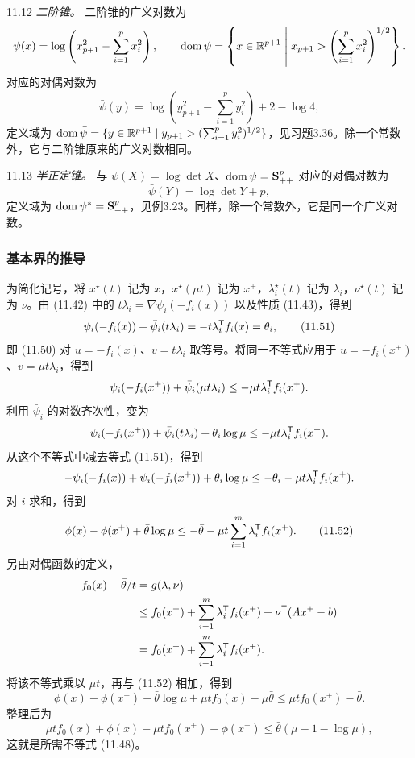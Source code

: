 \begin{origexample}{11.12}
\emph{二阶锥。} 二阶锥的广义对数为
\[
\psi(x)=\log\left(x_{p+1}^2-\sum_{i=1}^p x_i^2\right),\qquad
\operatorname{dom}\psi=\left\{x\in\mathbb R^{p+1}\;\middle|\;x_{p+1}>\left(\sum_{i=1}^p x_i^2\right)^{1/2}\right\}.
\]
对应的对偶对数为
\[
\bar\psi(y)=\log\left(y_{p+1}^2-\sum_{i=1}^p y_i^2\right)+2-\log4,
\]
定义域为 $\operatorname{dom}\bar\psi=\{y\in\mathbb R^{p+1}\mid y_{p+1}>(\sum_{i=1}^p y_i^2)^{1/2}\}$，见习题3.36。除一个常数外，它与二阶锥原来的广义对数相同。
\end{origexample}

\begin{origexample}{11.13}
\emph{半正定锥。} 与 $\psi(X)=\log\det X$、$\operatorname{dom}\psi=\mathbf S_{++}^p$ 对应的对偶对数为
\[
\bar\psi(Y)=\log\det Y+p,
\]
定义域为 $\operatorname{dom}\psi^*=\mathbf S_{++}^p$，见例3.23。同样，除一个常数外，它是同一个广义对数。
\end{origexample}

\subsubsection*{基本界的推导}
为简化记号，将 $x^\star(t)$ 记为 $x$，$x^\star(\mu t)$ 记为 $x^+$，$\lambda_i^\star(t)$ 记为 $\lambda_i$，$\nu^\star(t)$ 记为 $\nu$。由 (11.42) 中的 $t\lambda_i=\nabla\psi_i(-f_i(x))$ 以及性质 (11.43)，得到
\begin{equation}
\psi_i(-f_i(x))+\bar\psi_i(t\lambda_i)=-t\lambda_i^\mathsf T f_i(x)=\theta_i,\tag{11.51}
\end{equation}
即 (11.50) 对 $u=-f_i(x)$、$v=t\lambda_i$ 取等号。将同一不等式应用于 $u=-f_i(x^+)$、$v=\mu t\lambda_i$，得到
\[
\psi_i(-f_i(x^+))+\bar\psi_i(\mu t\lambda_i)\le-\mu t\lambda_i^\mathsf T f_i(x^+).
\]
利用 $\bar\psi_i$ 的对数齐次性，变为
\[
\psi_i(-f_i(x^+))+\bar\psi_i(t\lambda_i)+\theta_i\log\mu\le-\mu t\lambda_i^\mathsf T f_i(x^+).
\]
从这个不等式中减去等式 (11.51)，得到
\[
-\psi_i(-f_i(x))+\psi_i(-f_i(x^+))+\theta_i\log\mu
\le-\theta_i-\mu t\lambda_i^\mathsf T f_i(x^+).
\]
对 $i$ 求和，得到
\begin{equation}
\phi(x)-\phi(x^+)+\bar\theta\log\mu\le-\bar\theta-\mu t\sum_{i=1}^m\lambda_i^\mathsf T f_i(x^+).\tag{11.52}
\end{equation}
另由对偶函数的定义，
\begin{align*}
f_0(x)-\bar\theta/t&=g(\lambda,\nu)\\
&\le f_0(x^+)+\sum_{i=1}^m\lambda_i^\mathsf T f_i(x^+)+\nu^\mathsf T(Ax^+-b)\\
&=f_0(x^+)+\sum_{i=1}^m\lambda_i^\mathsf T f_i(x^+).
\end{align*}
将该不等式乘以 $\mu t$，再与 (11.52) 相加，得到
\[
\phi(x)-\phi(x^+)+\bar\theta\log\mu+\mu t f_0(x)-\mu\bar\theta
\le\mu t f_0(x^+)-\bar\theta.
\]
整理后为
\[
\mu t f_0(x)+\phi(x)-\mu t f_0(x^+)-\phi(x^+)\le\bar\theta(\mu-1-\log\mu),
\]
这就是所需不等式 (11.48)。
